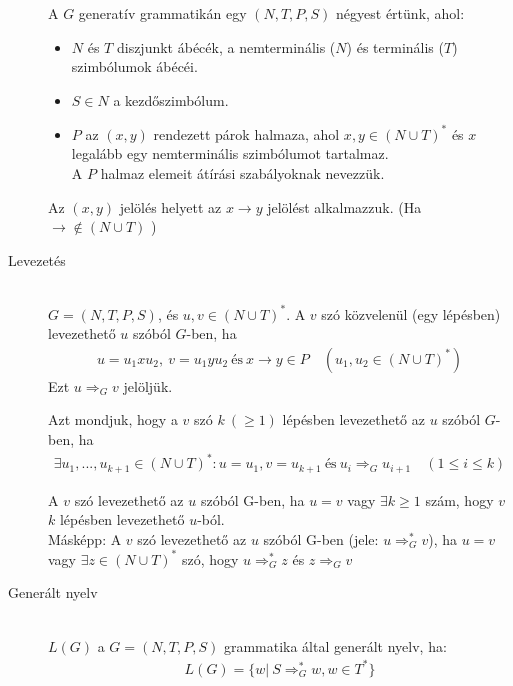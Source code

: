 \documentclass[margin=0px]{article}
\begin{document}
\begin{description}
						A $G$ generatív grammatikán egy $(N,T,P,S)$ négyest értünk, ahol:
							\begin{itemize}
								\item $N$ és $T$ diszjunkt ábécék, a nemterminális ($N$) és terminális ($T$) szimbólumok ábécéi.
								\item $S\in N$ a kezdőszimbólum.
								\item $P$ az $(x,y)$ rendezett párok halmaza, ahol $x,y \in (N \cup T)^*$ és $x$ legalább egy nemterminális szimbólumot tartalmaz. \\
								A $P$ halmaz elemeit átírási szabályoknak nevezzük.
							\end{itemize}
							Az $(x,y)$ jelölés helyett az $x \rightarrow y$ jelölést alkalmazzuk. (Ha $\rightarrow \notin (N\cup T)$ )
					\item[Levezetés] \hfill \\
						$ G = (N,T,P,S) $, és $u,v \in (N\cup T)^*$. A $v$ szó közvelenül (egy lépésben) levezethető $u$ szóból $G$-ben, ha
						\begin{align*}
							u = u_1xu_2, \ v = u_1yu_2 \ \textrm{és} \ x \rightarrow y \in P \quad (u_1, u_2 \in (N \cup T)^*)
						\end{align*}
						Ezt $ u \Longrightarrow_G v$ jelöljük.
						
						Azt mondjuk, hogy a $v$ szó $k \ (\geq 1)$ lépésben levezethető az $u$ szóból $G$-ben, ha
						\begin{align*}
							\exists u_1, ... , u_{k+1} \in (N\cup T)^*: u = u_1, v = u_{k+1} \ \textrm{és} \ u_i \Longrightarrow_G u_{i+1} \quad (1 \leq i \leq k)
 						\end{align*}
 						
 						A $v$ szó levezethető az $u$ szóból G-ben, ha $u=v$ vagy $\exists k \geq 1$ szám, hogy $v$ $k$ lépésben levezethető $u$-ból.\\
 						Másképp: A $v$ szó levezethető az $u$ szóból G-ben (jele: $ u \Longrightarrow_G^* v $), ha $u=v$ vagy $\exists z \in  (N\cup T)^*$ szó, hogy $ u \Longrightarrow_G^* z $ és $ z \Longrightarrow_G v $
 					\item[Generált nyelv] \hfill \\
	 					$L(G)$ a $G=(N,T,P,S)$ grammatika által generált nyelv, ha:
	 					\begin{align*}
	 						L(G) = \{w | \ S \Longrightarrow_G^* w, w \in T^*\}
	 					\end{align*}
				\end{description}
\end{document}
